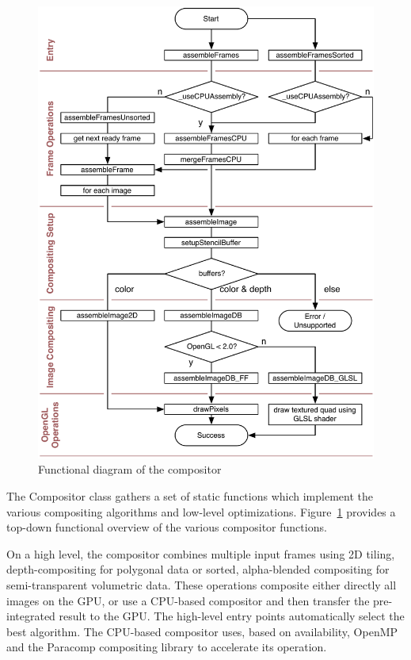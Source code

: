 \documentclass[10pt,a4]{scrartcl}
\newcommand{\fig}[1]{Figure~\ref{#1}}
\begin{document}
\begin{figure}[h!t]\center
  \includegraphics[width=.9\textwidth]{images/compositor.pdf}
  {\caption{\small\label{fCompositor}Functional diagram of the compositor}}
\end{figure}
The \textsf{Compositor} class gathers a set of static functions which
implement the various compositing algorithms and low-level
optimizations. \fig{fCompositor} provides a top-down functional overview
of the various compositor functions.

On a high level, the compositor combines multiple input frames using 2D
tiling, depth-compositing for polygonal data or sorted, alpha-blended
compositing for semi-transparent volumetric data. These operations
composite either directly all images on the GPU, or use a CPU-based
compositor and then transfer the pre-integrated result to the GPU. The
high-level entry points automatically select the best algorithm. The
CPU-based compositor uses, based on availability, OpenMP and the
Paracomp compositing library to accelerate its operation.
\end{document}
